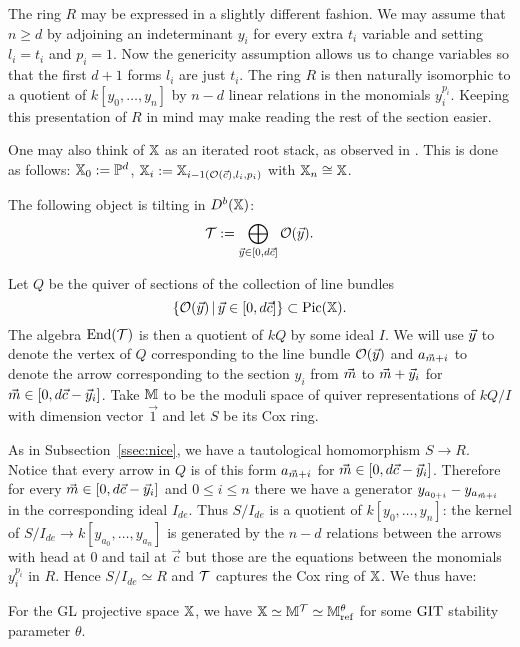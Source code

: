 \documentclass[12pt]{amsart}
\begin{document}
The ring $R$ may be expressed in a slightly different fashion. 
We may assume that $n\geq d$ by adjoining an indeterminant $y_i$ for every extra $t_i$ variable and setting $l_i= t_i$ and $p_i=1$. 
Now the genericity assumption allows us to change variables so that the first $d+1$ forms $l_i$ are just $t_i$.
The ring $R$ is then naturally isomorphic to a quotient of $k[y_0, \ldots, y_n]$ by $n-d$ linear relations in the monomials $y_i^{p_i}$.
Keeping this presentation of $R$ in mind may make reading the rest of the section easier.

One may also think of $\mathbb{X}$ as an iterated root stack, as observed in \cite[Observation 3.1.4]{HIMO}. This is done as follows: $\mathbb{X}_0:= \mathbb{P}^d$, $\mathbb{X}_i := \mathbb{X}_{i-1 (\mathcal{O}({\vec{c}}),l_i,p_i)}$ with $\mathbb{X}_n \cong \mathbb{X}$.

\begin{theorem}\cite[Theorem 6.1.2]{HIMO}
The following object is tilting in $D^b(\mathbb{X})$: $$\mathcal{T}:= \bigoplus_{{\vec{y}} \in [0,d{\vec{c}}]} \mathcal{O}({\vec{y}}).$$
\end{theorem}

Let $Q$ be the quiver of sections of the collection of line bundles $$\{\mathcal{O}({\vec{y}})\,|\,{\vec{y}} \in [0,d{\vec{c}}]\}\subset \operatorname{Pic}(\mathbb{X}).$$
The algebra $\operatorname{End}(\mathcal{T})$ is then a quotient of $kQ$ by some ideal $I$.
We will use ${\vec{y}}$ to denote the vertex of $Q$ corresponding to the line bundle $\mathcal{O}({\vec{y}})$ and $a_{{\vec{m}}+i}$ to denote the arrow corresponding to the section $y_i$ from ${\vec{m}}$ to ${\vec{m}}+{\vec{y}}_i$ for ${\vec{m}} \in [0, d{\vec{c}} - {\vec{y}}_i]$.
Take $\mathbb{M}$ to be the moduli space of quiver representations of $kQ/I$ with dimension vector $\vec{1}$ and let $S$ be its Cox ring.

As in Subsection~\ref{ssec:nice}, we have a tautological homomorphism $S \rightarrow R$.
Notice that every arrow in $Q$ is of this form $a_{{\vec{m}}+i}$ for ${\vec{m}} \in [0, d{\vec{c}} - {\vec{y}}_i]$.
Therefore for every ${\vec{m}} \in [0, d{\vec{c}} - {\vec{y}}_i]$ and $0\leq i\leq n$ there we have a generator $y_{a_{0+i}} - y_{a_{{\vec{m}}+i}}$ in the corresponding ideal $I_{de}$.
Thus $S/I_{de}$ is a quotient of $k[y_0,\ldots, y_n]$: the kernel of $S/I_{de} \rightarrow k[y_{a_0},\ldots, y_{a_n}]$ is generated by the $n-d$ relations between the arrows with head at $0$ and tail at $\vec{c}$ but those are the equations between the monomials $y_{i}^{p_i}$ in $R$.
Hence $S/I_{de} \simeq R$ and $\mathcal{T}$ captures the Cox ring of $\mathbb{X}$.
We thus have:

\begin{corollary} \label{cr:HIMO}
For the GL projective space $\mathbb{X}$, we have $\mathbb{X} \simeq \mathbb{M}^{\mathcal{T}} \simeq \mathbb{M}^\theta_\textup{ref}$ for some $\textup{GIT}$ stability parameter $\theta$.
\end{corollary}



\end{document}
